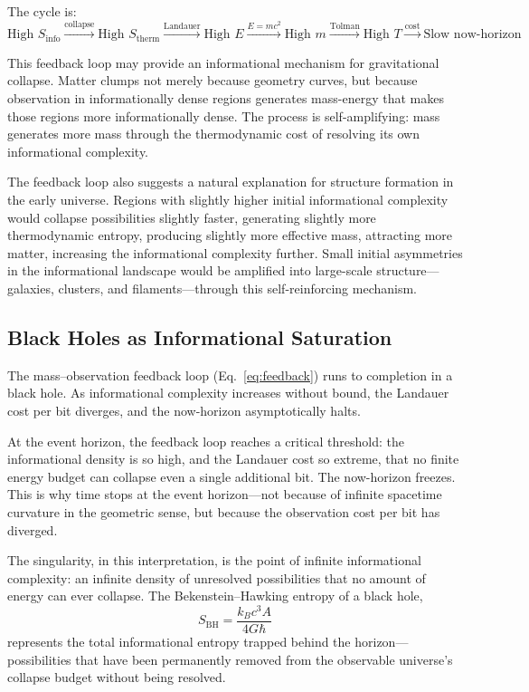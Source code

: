 \documentclass[12pt,a4paper]{article}
\begin{document}
The cycle is:
\begin{equation}
    \text{High } S_{\mathrm{info}} \xrightarrow{\text{collapse}} \text{High } S_{\mathrm{therm}} \xrightarrow{\text{Landauer}} \text{High } E \xrightarrow{E=mc^2} \text{High } m \xrightarrow{\text{Tolman}} \text{High } T \xrightarrow{\text{cost}} \text{Slow now-horizon}
    \label{eq:feedback}
\end{equation}

This feedback loop may provide an informational mechanism for gravitational collapse. Matter clumps not merely because geometry curves, but because observation in informationally dense regions generates mass-energy that makes those regions more informationally dense. The process is self-amplifying: mass generates more mass through the thermodynamic cost of resolving its own informational complexity.

The feedback loop also suggests a natural explanation for structure formation in the early universe. Regions with slightly higher initial informational complexity would collapse possibilities slightly faster, generating slightly more thermodynamic entropy, producing slightly more effective mass, attracting more matter, increasing the informational complexity further. Small initial asymmetries in the informational landscape would be amplified into large-scale structure---galaxies, clusters, and filaments---through this self-reinforcing mechanism.

\subsection{Black Holes as Informational Saturation}
\label{sec:blackholes}

The mass--observation feedback loop (Eq.~\ref{eq:feedback}) runs to completion in a black hole. As informational complexity increases without bound, the Landauer cost per bit diverges, and the now-horizon asymptotically halts.

At the event horizon, the feedback loop reaches a critical threshold: the informational density is so high, and the Landauer cost so extreme, that no finite energy budget can collapse even a single additional bit. The now-horizon freezes. This is why time stops at the event horizon---not because of infinite spacetime curvature in the geometric sense, but because the observation cost per bit has diverged.

The singularity, in this interpretation, is the point of infinite informational complexity: an infinite density of unresolved possibilities that no amount of energy can ever collapse. The Bekenstein--Hawking entropy of a black hole,
\begin{equation}
    S_{\mathrm{BH}} = \frac{k_B c^3 A}{4 G \hbar}
\end{equation}
represents the total informational entropy trapped behind the horizon---possibilities that have been permanently removed from the observable universe's collapse budget without being resolved.
\end{document}
